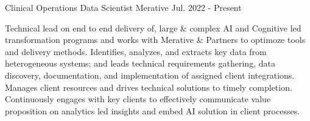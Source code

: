 

\begin{cventries}

  \cventry
    {Clinical Operations} %
    {Data Scientist} %
    {Merative}
    {Jul. 2022 - Present}
    {
      \begin{cvcompactparagraph}
        Technical lead on end to end delivery of, large \& complex AI and Cognitive led transformation programs and works with Merative \& Partners to optimoze tools and delivery methods.  Identifies, analyzes, and extracts key data from heterogeneous systems; and leads technical requirements gathering, data discovery, documentation, and implementation of assigned client integrations.  Manages client resources and drives technical solutions to timely completion.  Continuously engages with key clients to effectively communicate value proposition on analytics led insights and embed AI solution in client processes.
      \end{cvcompactparagraph}
    }


\end{cventries}
